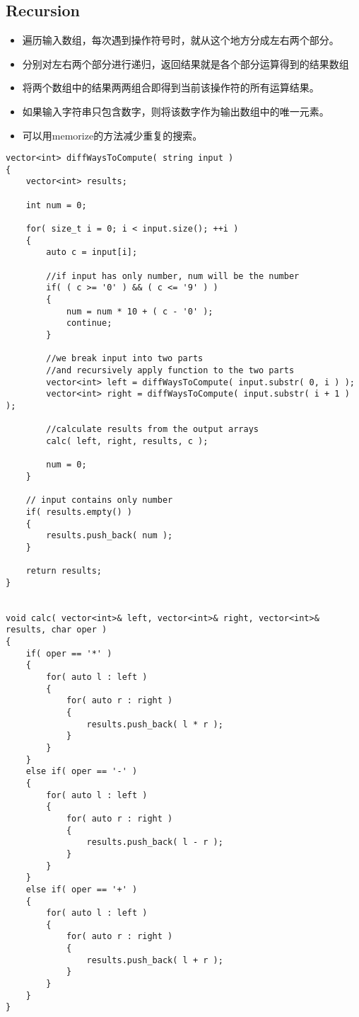 \subsection{Recursion}
\begin{itemize}
\item 遍历输入数组，每次遇到操作符号时，就从这个地方分成左右两个部分。
\item 分别对左右两个部分进行递归，返回结果就是各个部分运算得到的结果数组
\item 将两个数组中的结果两两组合即得到当前该操作符的所有运算结果。
\item 如果输入字符串只包含数字，则将该数字作为输出数组中的唯一元素。
\item 可以用memorize的方法减少重复的搜索。
\end{itemize}
\setcounter{lstlisting}{0}
\begin{lstlisting}[style=customc, caption={Recursion Without Memorization}]
vector<int> diffWaysToCompute( string input )
{
    vector<int> results;

    int num = 0;

    for( size_t i = 0; i < input.size(); ++i )
    {
        auto c = input[i];

        //if input has only number, num will be the number
        if( ( c >= '0' ) && ( c <= '9' ) )
        {
            num = num * 10 + ( c - '0' );
            continue;
        }

        //we break input into two parts
        //and recursively apply function to the two parts
        vector<int> left = diffWaysToCompute( input.substr( 0, i ) );
        vector<int> right = diffWaysToCompute( input.substr( i + 1 ) );

        //calculate results from the output arrays
        calc( left, right, results, c );

        num = 0;
    }

    // input contains only number
    if( results.empty() )
    {
        results.push_back( num );
    }

    return results;
}


void calc( vector<int>& left, vector<int>& right, vector<int>& results, char oper )
{
    if( oper == '*' )
    {
        for( auto l : left )
        {
            for( auto r : right )
            {
                results.push_back( l * r );
            }
        }
    }
    else if( oper == '-' )
    {
        for( auto l : left )
        {
            for( auto r : right )
            {
                results.push_back( l - r );
            }
        }
    }
    else if( oper == '+' )
    {
        for( auto l : left )
        {
            for( auto r : right )
            {
                results.push_back( l + r );
            }
        }
    }
}
\end{lstlisting}


